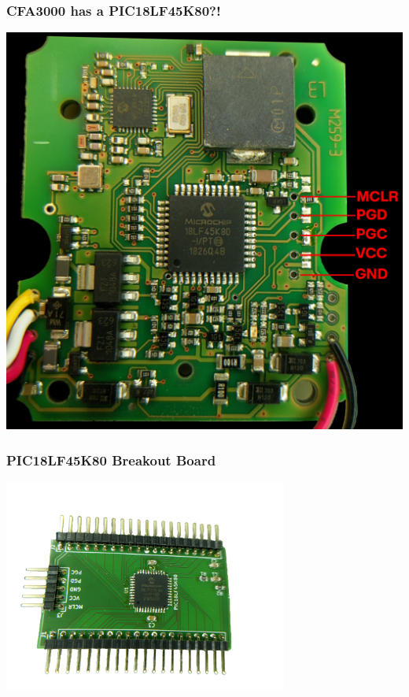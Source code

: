 \documentclass[aspectratio=169]{beamer}
\begin{document}
\begin{frame}
	\frametitle{CFA3000 has a PIC18LF45K80?!}

	\begin{center}
		\includegraphics[height=0.9\textheight]{cfa3000-pcb.jpg}
	\end{center}
\end{frame}

\begin{frame}
	\frametitle{PIC18LF45K80 Breakout Board}

	\begin{center}
		\includegraphics[width=0.7\textwidth]{pic-breakoutboard.png}
	\end{center}
\end{frame}
\end{document}

